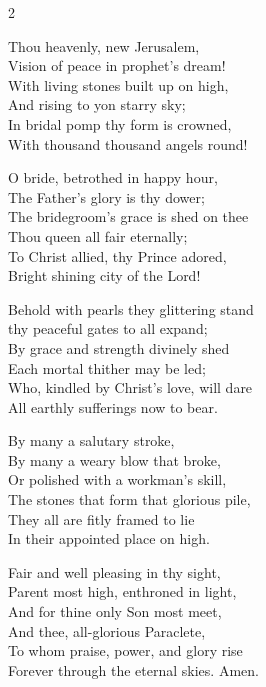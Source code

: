 \begin{multicols}{2}
\raggedcolumns
\begin{enpars}
Thou heavenly, new Jerusalem,\\
Vision of peace in prophet's dream!\\
With living stones built up on high,\\
And rising to yon starry sky;\\
In bridal pomp thy form is crowned,\\
With thousand thousand angels round!

O bride, betrothed in happy hour,\\
The Father's glory is thy dower;\\
The bridegroom's grace is shed on thee\\
Thou queen all fair eternally;\\
To Christ allied, thy Prince adored,\\
Bright shining city of the Lord!

Behold with pearls they glittering stand\\
thy peaceful gates to all expand;\\
By grace and strength divinely shed\\
Each mortal thither may be led;\\
Who, kindled by Christ's love, will dare\\
All earthly sufferings now to bear.

By many a salutary stroke,\\
By many a weary blow that broke,\\
Or polished with a workman's skill,\\
The stones that form that glorious pile,\\
They all are fitly framed to lie\\
In their appointed place on high.

Fair and well pleasing in thy sight,\\
Parent most high, enthroned in light,\\
And for thine only Son most meet,\\
And thee, all-glorious Paraclete,\\
To whom praise, power, and glory rise\\
Forever through the eternal skies. Amen.
\end{enpars}
\end{multicols}
